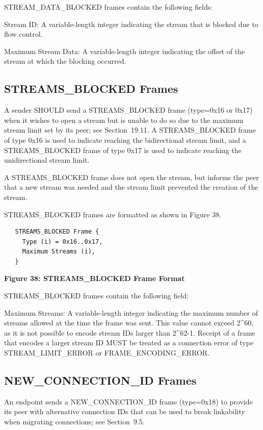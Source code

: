 \documentclass{article}
\begin{document}
STREAM\_DATA\_BLOCKED frames contain the following fields:

Stream ID:  A variable-length integer indicating the stream that is blocked due to flow control.

Maximum Stream Data:  A variable-length integer indicating the offset of the stream at which the blocking occurred.

\subsection{STREAMS\_BLOCKED Frames}

A sender SHOULD send a STREAMS\_BLOCKED frame (type=0x16 or 0x17) when it wishes to open a stream but is unable to do so due to the maximum stream limit set by its peer; see Section~19.11.  A STREAMS\_BLOCKED frame of type 0x16 is used to indicate reaching the bidirectional stream limit, and a STREAMS\_BLOCKED frame of type 0x17 is used to indicate reaching the unidirectional stream limit.

A STREAMS\_BLOCKED frame does not open the stream, but informs the peer that a new stream was needed and the stream limit prevented the creation of the stream.

STREAMS\_BLOCKED frames are formatted as shown in Figure 38.

\begin{verbatim}
   STREAMS_BLOCKED Frame {
     Type (i) = 0x16..0x17,
     Maximum Streams (i),
   }
\end{verbatim}

\begin{center}
\textbf{Figure 38: STREAMS\_BLOCKED Frame Format}
\end{center}

STREAMS\_BLOCKED frames contain the following field:

Maximum Streams:  A variable-length integer indicating the maximum number of streams allowed at the time the frame was sent.  This value cannot exceed 2\textasciicircum{}60, as it is not possible to encode stream IDs larger than 2\textasciicircum{}62-1.  Receipt of a frame that encodes a larger stream ID MUST be treated as a connection error of type STREAM\_LIMIT\_ERROR or FRAME\_ENCODING\_ERROR.

\subsection{NEW\_CONNECTION\_ID Frames}

An endpoint sends a NEW\_CONNECTION\_ID frame (type=0x18) to provide its peer with alternative connection IDs that can be used to break linkability when migrating connections; see Section~9.5.
\end{document}
